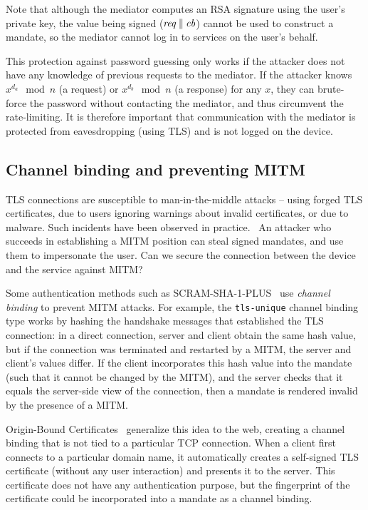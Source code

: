 Note that although the mediator computes an RSA signature using the user's private key, the value
being signed ($\mathit{req} \mathbin{\|} \mathit{cb}$) cannot be used to construct a mandate, so the
mediator cannot log in to services on the user's behalf.

This protection against password guessing only works if the attacker does not have any knowledge of
previous requests to the mediator. If the attacker knows $x^{d_a} \mod n$ (a request) or
$x^{d_b} \mod n$ (a response) for any $x$, they can brute-force the password without contacting the
mediator, and thus circumvent the rate-limiting.  It is therefore important that communication with
the mediator is protected from eavesdropping (using TLS) and is not logged on the device.

\subsection{Channel binding and preventing MITM}\label{sec:channelbinding}

TLS connections are susceptible to man-in-the-middle attacks -- using forged TLS certificates, due
to users ignoring warnings about invalid certificates, or due to malware. Such incidents have been
observed in practice.~\cite{Huang14, Adkins11} An attacker who succeeds in establishing a MITM
position can steal signed mandates, and use them to impersonate the user. Can we secure the
connection between the device and the service against MITM?

Some authentication methods such as SCRAM-SHA-1-PLUS~\cite{SCRAM} use \emph{channel binding} to
prevent MITM attacks. For example, the \texttt{tls-unique} channel binding type works by hashing the
handshake messages that established the TLS connection: in a direct connection, server and client
obtain the same hash value, but if the connection was terminated and restarted by a MITM, the server
and client's values differ. If the client incorporates this hash value into the mandate (such that
it cannot be changed by the MITM), and the server checks that it equals the server-side view of the
connection, then a mandate is rendered invalid by the presence of a MITM.

Origin-Bound Certificates~\cite{Dietz12} generalize this idea to the web, creating a channel
binding that is not tied to a particular TCP connection. When a client first connects to a
particular domain name, it automatically creates a self-signed TLS certificate (without any user
interaction) and presents it to the server. This certificate does not have any authentication
purpose, but the fingerprint of the certificate could be incorporated into a mandate as a channel
binding.

